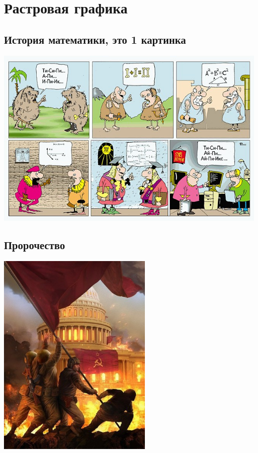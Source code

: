 \section[Рисунки]{Растровая графика}
\subsection[Математика]{История математики, это 1 картинка}


	\begin{center} 
		\includegraphics[width=15cm]{img/math.jpg}
	\end{center}
	
\pagebreak %

\subsection{Пророчество}
	\begin{center} 
		\includegraphics[height=100mm]{img/theFutureofUsa.jpg}
	\end{center}
